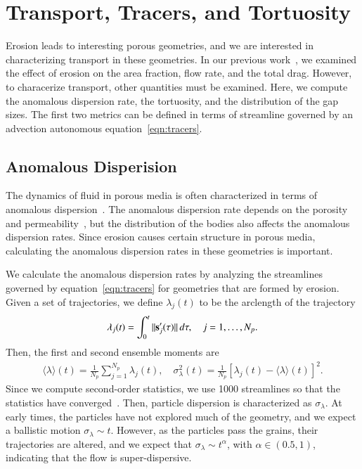 \documentclass[preprint, 10pt]{elsarticle}
\begin{document}
\section{Transport, Tracers, and Tortuosity}
\label{sec:transport}
Erosion leads to interesting porous geometries, and we are interested in
characterizing transport in these geometries.  In our previous
work~\cite{qua-moo2018}, we examined the effect of erosion on the area
fraction, flow rate, and the total drag.  However, to characerize
transport, other quantities must be examined.  Here, we compute the
anomalous dispersion rate, the tortuosity, and the distribution of the
gap sizes.  The first two metrics can be defined in terms of streamline
governed by an advection autonomous equation~\eqref{eqn:tracers}.

\subsection{Anomalous Disperision}
\label{sec:dispersion}
The dynamics of fluid in porous media is often characterized in terms of
anomalous dispersion~\cite{kla-rad-sok2008, den-cor-sch-ber2004}.  The
anomalous dispersion rate depends on the porosity and
permeability~\cite{koc-bra1988}, but the distribution of the bodies also
affects the anomalous dispersion rates.  Since erosion causes certain
structure in porous media, calculating the anomalous dispersion rates in
these geometries is important.

We calculate the anomalous dispersion rates by analyzing the streamlines
governed by equation~\eqref{eqn:tracers} for geometries that are formed
by erosion.  Given a set of trajectories, we define $\lambda_j(t)$ to be
the arclength of the trajectory
\begin{align}
  \lambda_j(t) = \int_{0}^t \|\ss'_j(\tau)\|\, d\tau, 
    \quad j=1,\ldots,N_p.
\end{align}
Then, the first and second ensemble moments are
\begin{align}
  \label{eqn:moments}
  \langle \lambda \rangle (t) = 
    \frac{1}{N_p} \sum_{j=1}^{N_p} \lambda_j(t), \quad 
    \sigma_\lambda^2(t) = \frac{1}{N_p} 
    \left[\lambda_j(t) - \langle \lambda \rangle(t) \right]^2.
\end{align}
Since we compute second-order statistics, we use 1000 streamlines so
that the statistics have converged~\cite{bel-sal-rin1992}.  Then,
particle dispersion is characterized as $\sigma_\lambda$.  At early
times, the particles have not explored much of the geometry, and we
expect a ballistic motion $\sigma_\lambda \sim t$.  However, as the
particles pass the grains, their trajectories are altered, and we expect
that $\sigma_\lambda \sim t^\alpha$, with $\alpha \in (0.5,1)$,
indicating that the flow is super-dispersive.
\end{document}
